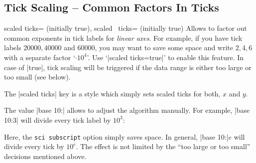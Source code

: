 \subsection{Tick Scaling -- Common Factors In Ticks}
\label{sec:scaled:ticks}

\begin{pgfplotsxykeylist}{%
    scaled ticks= (initially true),
    scaled \x\ ticks= (initially true)%
}
    Allows to factor out common exponents in tick labels for \emph{linear
    axes}. For example, if you have tick labels $20000,40000$ and $60000$, you
    may want to save some space and write $2,4,6$ with a separate factor
    `$\cdot 10^4$'. Use `|scaled ticks=true|' to enable this feature. In case
    of |true|, tick scaling will be triggered if the data range is either too
    large or too small (see below).
\begin{codeexample}[]
%
\end{codeexample}

\begin{codeexample}[]
\end{codeexample}

    The |scaled ticks| key is a style which simply sets scaled ticks for both,
    $x$ and $y$.

    The value |base 10:| allows to adjust the algorithm manually. For
    example, |base 10:3| will divide every tick label by $10^3$:
\begin{codeexample}[]
\end{codeexample}
    \noindent Here, the \texttt{sci subscript} option simply saves space. In
    general, |base 10:|$e$ will divide every tick by $10^e$. The effect is not
    limited by the ``too large or too small'' decisions mentioned above.


\end{pgfplotsxykeylist}
